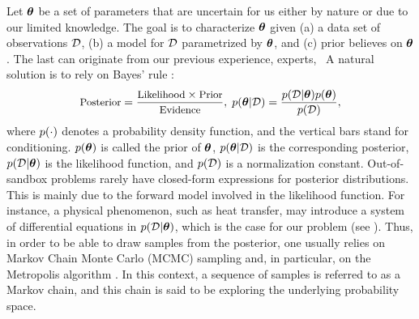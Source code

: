 Let ${\boldsymbol\theta}$ be a set of parameters that are uncertain for us either by nature or due to our limited knowledge. The goal is to characterize ${\boldsymbol\theta}$ given (a) a data set of observations $\mathcal{D}$, (b) a model for $\mathcal{D}$ parametrized by ${\boldsymbol\theta}$, and (c) prior believes on ${\boldsymbol\theta}$. The last can originate from our previous experience, experts, \etc\ A natural solution is to rely on Bayes' rule \cite{gelman2004}:
\begin{equation} \elabel{bayes}
  \text{\small Posterior} = \frac{\text{\small Likelihood} \times \text{\small Prior}}{\text{\small Evidence}}, \; \f{\vparam | \Data} = \frac{\f{\Data | \vparam} \f{\vparam}}{\f{\Data}},
\end{equation}
where $\f{\cdot}$ denotes a probability density function, and the vertical bars stand for conditioning. $\f{\vparam}$ is called the prior of ${\boldsymbol\theta}$, $\f{\vparam | \Data}$ is the corresponding posterior, $\f{\Data | \vparam}$ is the likelihood function, and $\f{\Data}$ is a normalization constant.
Out-of-sandbox problems rarely have closed-form expressions for posterior distributions. This is mainly due to the forward model involved in the likelihood function. For instance, a physical phenomenon, such as heat transfer, may introduce a system of differential equations in $\f{\Data | \vparam}$, which is the case for our problem (see ).
Thus, in order to be able to draw samples from the posterior, one usually relies on Markov Chain Monte Carlo (MCMC) sampling and, in particular, on the Metropolis algorithm \cite{gelman2004}. In this context, a sequence of samples is referred to as a Markov chain, and this chain is said to be exploring the underlying probability space.
